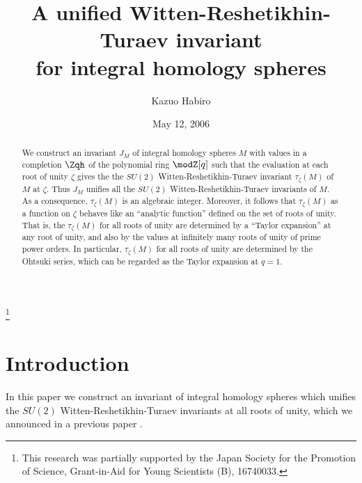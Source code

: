 \documentclass{amsart}
\numberwithin{equation}{section}
\numberwithin{figure}{section}
\theoremstyle{plain}
\theoremstyle{definition}
\theoremstyle{remark}
\begin{document}
\title[A unified Witten-Reshetikhin-Turaev invariant]{A unified
 Witten-Reshetikhin-Turaev invariant\\for integral homology spheres}

\author{Kazuo Habiro}

\address{Research Institute for Mathematical Sciences\\ Kyoto
University\\ Kyoto\\ 606-8502\\ Japan}


\thanks{This research was partially supported by the Japan Society for
  the Promotion of Science, Grant-in-Aid for Young Scientists (B),
  16740033.}

\date{May 12, 2006}
%

\begin{abstract}
  We construct an invariant $J_M$ of integral homology spheres $M$
  with values in a completion $\Zqh$ of the polynomial ring $\modZ [q]$
  such that the evaluation at each root of unity $\zeta $ gives the the
  $SU(2)$ Witten-Reshetikhin-Turaev invariant $\tau _\zeta (M)$ of $M$ at
  $\zeta $.  Thus $J_M$ unifies all the $SU(2)$ Witten-Reshetikhin-Turaev
  invariants of $M$.  As a consequence, $\tau _\zeta (M)$ is an algebraic
  integer.  Moreover, it follows that $\tau _\zeta (M)$ as a function on $\zeta $
  behaves like an ``analytic function'' defined on the set of roots of
  unity.  That is, the $\tau _\zeta (M)$ for all roots of unity are
  determined by a ``Taylor expansion'' at any root of unity, and also
  by the values at infinitely many roots of unity of prime power
  orders.  In particular, $\tau _\zeta (M)$ for all roots of unity are
  determined by the Ohtsuki series, which can be regarded as the
  Taylor expansion at $q=1$.
\end{abstract}

%

\maketitle
%

\section{Introduction}
\label{sec1}

In this paper we construct an invariant of integral homology spheres
which unifies the $SU(2)$ Witten-Reshetikhin-Turaev invariants at all
roots of unity, which we announced in a previous paper
\cite{H:rims2001}.
\end{document}
